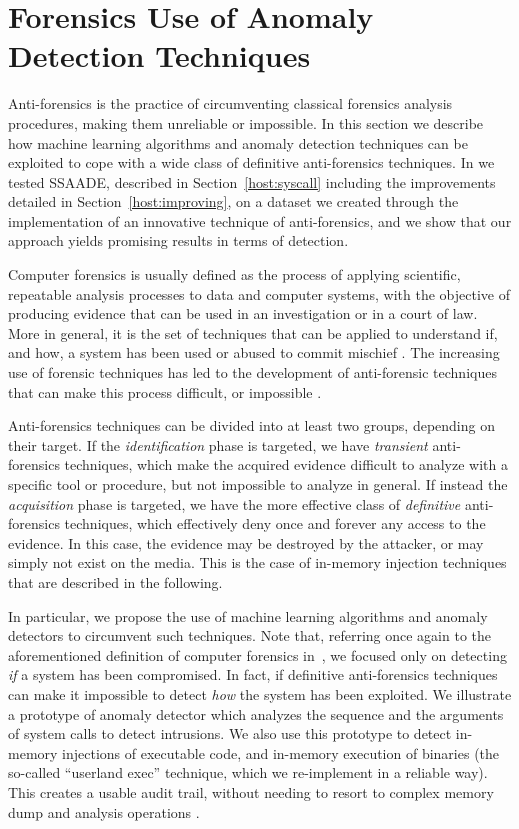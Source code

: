 \section{Forensics Use of Anomaly Detection Techniques}
\label{host:forensics}
Anti-forensics is the practice of circumventing classical forensics
analysis procedures, making them unreliable or impossible. In this
section we describe how machine learning algorithms and anomaly
detection techniques can be exploited to cope with a wide class of
definitive anti-forensics techniques. In \citep{zanero_self} we tested
\ac{SSAADE}, described in Section~\ref{host:syscall} including the
improvements detailed in Section~\ref{host:improving}, on a dataset we
created through the implementation of an innovative technique of
anti-forensics, and we show that our approach yields promising results
in terms of detection.

Computer forensics is usually defined as the process of applying
scientific, repeatable analysis processes to data and computer
systems, with the objective of producing evidence that can be used in
an investigation or in a court of law. More in general, it is the set
of techniques that can be applied to understand if, and how, a system
has been used or abused to commit mischief \citep{mohay}. The
increasing use of forensic techniques has led to the development of
anti-forensic techniques that can make this process difficult, or
impossible \citep{garfinkel,berghel,ryan}.

Anti\hyp{}forensics techniques can be divided into at least two
groups, depending on their target. If the \emph{identification} phase
is targeted, we have \emph{transient} anti-forensics techniques, which
make the acquired evidence difficult to analyze with a specific tool
or procedure, but not impossible to analyze in general. If instead the
\emph{acquisition} phase is targeted, we have the more effective class
of \emph{definitive} anti-forensics techniques, which effectively deny
once and forever any access to the evidence. In this case, the
evidence may be destroyed by the attacker, or may simply not exist on
the media. This is the case of in-memory injection techniques that are
described in the following.

In particular, we propose the use of machine learning algorithms and
anomaly detectors to circumvent such techniques. Note that, referring
once again to the aforementioned definition of computer forensics
in~\citep{mohay}, we focused only on detecting \emph{if} a system has
been compromised. In fact, if definitive anti-forensics techniques can
make it impossible to detect \emph{how} the system has been
exploited. We illustrate a prototype of anomaly detector which
analyzes the sequence and the arguments of system calls to detect
intrusions. We also use this prototype to detect in-memory injections
of executable code, and in-memory execution of binaries (the so-called
``userland exec'' technique, which we re-implement in a reliable
way). This creates a usable audit trail, without needing to resort to
complex memory dump and analysis operations
\citep{burdach,ring2004vmc}.

